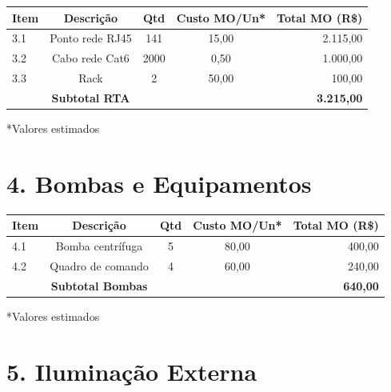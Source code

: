\documentclass[12pt,a4paper]{article}
\renewenvironment{table}%
{\begin{center}%
\scriptsize%
\addtolength{\tabcolsep}{-2pt}%
}%
{\end{center}}
\begin{document}
\begin{table}
\centering
\begin{tabular}{lcccr}
\toprule
\textbf{Item} & \textbf{Descrição} & \textbf{Qtd} & \textbf{Custo MO/Un*} & \textbf{Total MO (R\$)} \\
\midrule
3.1 & Ponto rede RJ45 & 141 & 15,00 & 2.115,00 \\
3.2 & Cabo rede Cat6 & 2000 & 0,50 & 1.000,00 \\
3.3 & Rack & 2 & 50,00 & 100,00 \\
\midrule
 & \textbf{Subtotal RTA} & & & \textbf{3.215,00} \\
\bottomrule
\end{tabular}
\end{table}

\noindent\small{*Valores estimados}

\section{4. Bombas e Equipamentos}

\begin{table}
\centering
\begin{tabular}{lcccr}
\toprule
\textbf{Item} & \textbf{Descrição} & \textbf{Qtd} & \textbf{Custo MO/Un*} & \textbf{Total MO (R\$)} \\
\midrule
4.1 & Bomba centrífuga & 5 & 80,00 & 400,00 \\
4.2 & Quadro de comando & 4 & 60,00 & 240,00 \\
\midrule
 & \textbf{Subtotal Bombas} & & & \textbf{640,00} \\
\bottomrule
\end{tabular}
\end{table}

\noindent\small{*Valores estimados}

\section{5. Iluminação Externa}
\end{document}
